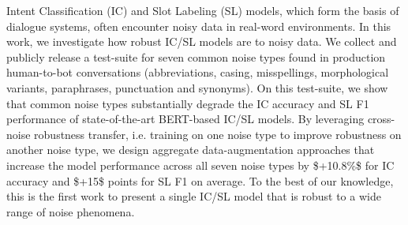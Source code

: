 Intent Classification (IC) and Slot Labeling (SL) models, which form the basis of dialogue systems, often encounter noisy data in real-word environments. In this work, we investigate how robust IC/SL models are to noisy data. We collect and publicly release a test-suite for seven common noise types found in production human-to-bot conversations (abbreviations, casing, misspellings, morphological variants, paraphrases, punctuation and synonyms). On this test-suite, we show that common noise types substantially degrade the IC accuracy and SL F1 performance of state-of-the-art BERT-based IC/SL models. By leveraging cross-noise robustness transfer, i.e. training on one noise type to improve robustness on another noise type, we design aggregate data-augmentation approaches that increase the model performance across all seven noise types by \$+10.8\%\$ for IC accuracy and \$+15\$ points for SL F1 on average. To the best of our knowledge, this is the first work to present a single IC/SL model that is robust to a wide range of noise phenomena.
